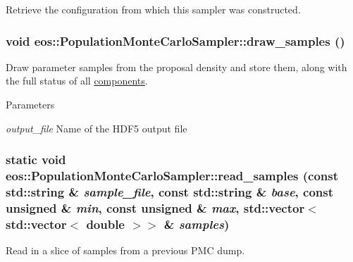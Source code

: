 Retrieve the configuration from which this sampler was constructed. \hypertarget{classeos_1_1PopulationMonteCarloSampler_a89aafb7a0eea4a3d3f7c14c4678cb4fa}{
\subsubsection[{draw\_\-samples}]{\setlength{\rightskip}{0pt plus 5cm}void eos::PopulationMonteCarloSampler::draw\_\-samples ()}}
\label{classeos_1_1PopulationMonteCarloSampler_a89aafb7a0eea4a3d3f7c14c4678cb4fa}
Draw parameter samples from the proposal density and store them, along with the full status of all \hyperlink{namespaceeos_1_1components}{components}.


\begin{DoxyParams}{Parameters}
\item[{\em output\_\-file}]Name of the HDF5 output file \end{DoxyParams}
\hypertarget{classeos_1_1PopulationMonteCarloSampler_a69d7eee659c32197c19424aaf74a1eb8}{
\subsubsection[{read\_\-samples}]{\setlength{\rightskip}{0pt plus 5cm}static void eos::PopulationMonteCarloSampler::read\_\-samples (const std::string \& {\em sample\_\-file}, \/  const std::string \& {\em base}, \/  const unsigned \& {\em min}, \/  const unsigned \& {\em max}, \/  std::vector$<$ std::vector$<$ double $>$$>$ \& {\em samples})}}
\label{classeos_1_1PopulationMonteCarloSampler_a69d7eee659c32197c19424aaf74a1eb8}
Read in a slice of samples from a previous PMC dump.


